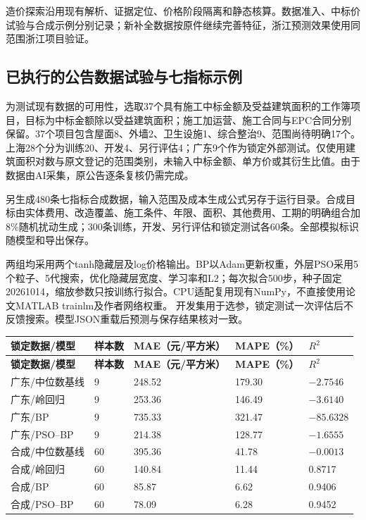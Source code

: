 造价探索沿用现有解析、证据定位、价格阶段隔离和静态核算。数据准入、中标价试验与合成示例分别记录；新补全数据按原件继续完善特征，浙江预测效果使用同范围浙江项目验证。

\subsection{已执行的公告数据试验与七指标示例}

为测试现有数据的可用性，选取37个具有施工中标金额及受益建筑面积的工作簿项目，目标为中标金额除以受益建筑面积；施工加运营、施工合同与EPC合同分别保留。37个项目包含屋面8、外墙2、卫生设施1、综合整治9、范围尚待明确17个。上海28个分为训练20、开发4、另行评估4；广东9个作为锁定外部测试。仅使用建筑面积对数与原文登记的范围类别，未输入中标金额、单方价或其衍生比值。由于数据由AI采集，原公告逐条复核仍需完成。

另生成480条七指标合成数据，输入范围及成本生成公式另存于运行目录。合成目标由实体费用、改造覆盖、施工条件、年限、面积、其他费用、工期的明确组合加8\%随机扰动生成；300条训练，开发、另行评估和锁定测试各60条。全部模拟标识随模型和导出保存。

两组均采用两个tanh隐藏层及log价格输出。BP以Adam更新权重，外层PSO采用5个粒子、5代搜索，优化隐藏层宽度、学习率和L2；每次拟合500步，种子固定20261014，缩放参数只按训练行拟合。CPU适配复用现有NumPy，不直接使用论文MATLAB trainlm及作者网络权重。\cite{adam} 开发集用于选参，锁定测试一次评估后不反馈搜索。模型JSON重载后预测与保存结果核对一致。

\begin{longtable}{@{}L{36mm}L{26mm}L{29mm}L{29mm}L{26mm}@{}}
\toprule\textbf{锁定数据/模型}&\textbf{样本数}&\textbf{MAE（元/平方米）}&\textbf{MAPE（\%）}&\textbf{$R^2$}\\
\midrule\endfirsthead
\toprule\textbf{锁定数据/模型}&\textbf{样本数}&\textbf{MAE（元/平方米）}&\textbf{MAPE（\%）}&\textbf{$R^2$}\\
\midrule\endhead
广东/中位数基线&9&248.52&179.30&$-2.7546$\\
广东/岭回归&9&253.36&146.49&$-3.6140$\\
广东/BP&9&735.33&321.47&$-85.6328$\\
广东/PSO--BP&9&214.38&128.77&$-1.6555$\\
合成/中位数基线&60&395.36&41.78&$-0.0013$\\
合成/岭回归&60&140.84&11.44&0.8717\\
合成/BP&60&85.87&6.62&0.9406\\
合成/PSO--BP&60&78.09&6.28&0.9452\\
\bottomrule\end{longtable}


